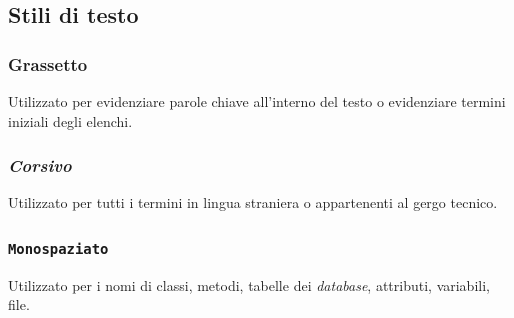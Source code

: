 \subsection{Stili di testo}

\subsubsection{\textbf{Grassetto}}

Utilizzato per evidenziare parole chiave all'interno del testo o evidenziare termini iniziali degli elenchi.

\subsubsection{\textit{Corsivo}}

Utilizzato per tutti i termini in lingua straniera o appartenenti al gergo tecnico.

\subsubsection{\texttt{Monospaziato}}

Utilizzato per i nomi di classi, metodi, tabelle dei \textit{database}, attributi, variabili, file.
